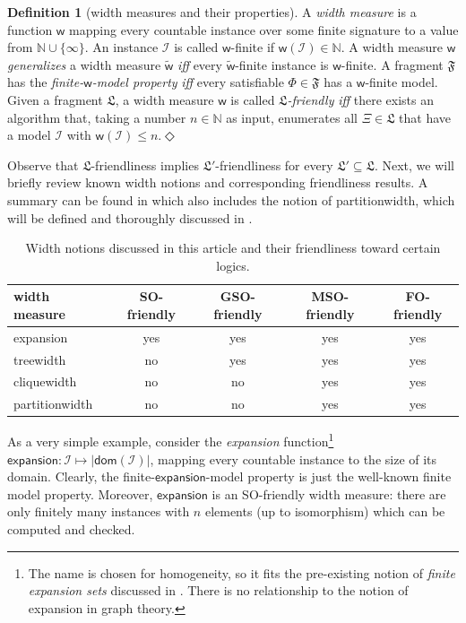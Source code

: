 \documentclass[10pt,a4paper]{amsart}
\theoremstyle{definition}
\numberwithin{equation}{section}
\theoremstyle{plain}
\theoremstyle{definition}
\newtheorem{definition}[definition]{Definition}
\theoremstyle{myexample}
\theoremstyle{plain}
\theoremstyle{definition}
\newcommand{\instance}{\mathcal{I}}
\newcommand{\inst}{\instance}
\newcommand{\adom}[1]{\fcn{dom}(#1)}
\newcommand{\fcn}[1]{\mathsf{#1}}
\newcommand{\iffi}{\textit{iff} } %
\newcommand{\defend}{\hfill\ensuremath{\Diamond}}
\begin{document}
\begin{definition}[width measures and their properties]\label{def:MSOfriendly}
A \emph{width measure} is a function $\fcn{w}$ mapping every countable instance over some finite signature to a value from $\mathbb{N} \cup \{\infty\}$. An instance $\instance$ is called $\fcn{w}$-finite if $\fcn{w}(\instance)\in \mathbb{N}$.
A width measure $\fcn{w}$ \emph{generalizes} a width measure $\widetilde{\fcn{w}}$ \iffi
every $\widetilde{\fcn{w}}$-finite instance is $\fcn{w}$-finite.    
A fragment $\mathfrak{F}$ has the \emph{finite-$\fcn{w}$-model property} \iffi every satisfiable $\Phi \in \mathfrak{F}$ has a $\fcn{w}$-finite model. 
Given a fragment $\mathfrak{L}$, a width measure $\fcn{w}$ is called \emph{$\mathfrak{L}$-friendly} \iffi  
there exists an algorithm that, taking a number $n \in \mathbb{N}$ as input, enumerates all $\Xi \in \mathfrak{L}$ 
that have a model $\instance$ with $\fcn{w}(\instance)\leq n$.\defend
\end{definition}

Observe that $\mathfrak{L}$-friendliness implies $\mathfrak{L}'$-friendliness for every $\mathfrak{L}'\subseteq\mathfrak{L}$. 
Next, we will briefly review known width notions and corresponding friendliness results. A summary can be found in  which also includes the notion of partitionwidth, which will be defined and thoroughly discussed in . 

\begin{table}%
	\begin{center}
		\begin{tabular}{lcccc}
			width measure  & SO-friendly & GSO-friendly & MSO-friendly & FO-friendly \\\hline
			expansion & yes & yes & yes & yes \\ 
			treewidth & no & yes & yes & yes \\
			cliquewidth & no & no & yes & yes \\
			partitionwidth & no & no & yes & yes \\\hline
		\end{tabular}
		\caption{Width notions discussed in this article and their friendliness toward certain logics.\label{tab:friendly}}
	\end{center}
\end{table}

\medskip {}
As a very simple example, consider the \emph{expansion} function\footnote{The name is chosen for homogeneity, so it fits the pre-existing notion of \emph{finite expansion sets} discussed in . There is no relationship to the notion of expansion in graph theory.} $\fcn{expansion}: \inst \mapsto |\adom{\inst}|$, mapping every countable instance to the size of its domain. Clearly, the finite-$\fcn{expansion}$-model property is just the well-known finite model property. Moreover, $\fcn{expansion}$ is an SO-friendly width measure: there are only finitely many instances with $n$ elements (up to isomorphism) which can be computed and checked. 
\end{document}
